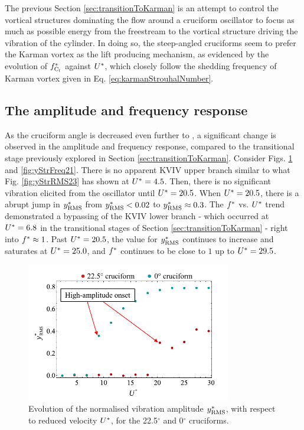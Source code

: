 \documentclass[oneside]{utmthesis}
\begin{document}
The previous Section \ref{sec:transitionToKarman} is an attempt to control the vortical structures dominating the flow around a cruciform oscillator to focus as much as possible energy from the freestream to the vortical structure driving the vibration of the cylinder. In doing so, the steep-angled cruciforms seem to prefer the Karman vortex as the lift producing mechanism, as evidenced by the evolution of $f_{\text{C}_{l}}^{*}$ against $U^{*}$, which closely follow the shedding frequency of Karman vortex given in Eq. \ref{eq:karmanStrouhalNumber}.

\subsection{The amplitude and frequency response}\label{ssec:kvivAmpFreqResp}

As the cruciform angle is decreased even further to \angtw{}, a significant change is observed in the amplitude and frequency response, compared to the transitional stage previously explored in Section \ref{sec:transitionToKarman}. Consider Figs. \ref{fig:yStrRMS45} and \ref{fig:yStrFreq21}. There is no apparent KVIV upper branch similar to what  Fig. \ref{fig:yStrRMS23} has shown at $U^{*} = 4.5$. Then, there is no significant vibration elicited from the oscillator until $U^{*} = 20.5$. When $U^{*} = 20.5$, there is a abrupt jump in $y^{*}_{\text{RMS}}$ from $y^{*}_{\text{RMS}} < 0.02$ to $y^{*}_{\text{RMS}} \approx 0.3$. The $f^{*}$ vs. $U^{*}$ trend demonstrated a bypassing of the KVIV lower branch - which occurred at $U^{*} = 6.8$ in the transitional stages of Section \ref{sec:transitionToKarman} - right into $f^{*} \approx 1$. Past $U^{*} = 20.5$, the value for $y^{*}_{\text{RMS}}$ continues to increase and saturates at $U^{*} = 25.0$, and $f^{*}$ continues to be close to $1$ up to $U^{*} = 29.5$.

\begin{figure}[H]
  \centering
  \includegraphics[width=0.8\textwidth]{figs/yStrRMS45}
  \caption{Evolution of the normalised vibration amplitude $y^{*}_{\text{RMS}}$, with respect to reduced velocity $U^{*}$, for the 22.5$^{\circ}$ and 0$^{\circ}$ cruciforms.}
  \label{fig:yStrRMS45}
\end{figure}
\end{document}
